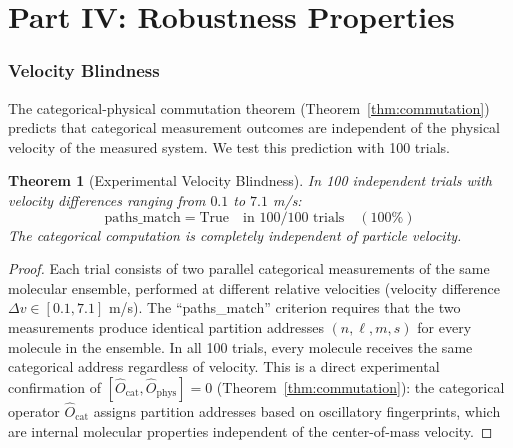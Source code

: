 \documentclass[twocolumn,10pt,a4paper]{article}
\newtheorem{theorem}{Theorem}[section]
\theoremstyle{definition}
\theoremstyle{remark}
\newcommand{\Ocat}{\hat{O}_{\mathrm{cat}}}
\newcommand{\Ophys}{\hat{O}_{\mathrm{phys}}}
\begin{document}

\part*{Part IV: Robustness Properties}

\section{Velocity Blindness}
\label{sec:velocity}

The categorical-physical commutation theorem (Theorem~\ref{thm:commutation}) predicts that categorical measurement outcomes are independent of the physical velocity of the measured system. We test this prediction with 100 trials.

\begin{theorem}[Experimental Velocity Blindness]
\label{thm:velocity_exp}
In 100 independent trials with velocity differences ranging from $0.1$ to $7.1$ m/s:
\begin{equation}
\label{eq:velocity_result}
\text{paths\_match} = \text{True} \quad \text{in } 100/100 \text{ trials} \quad (100\%)
\end{equation}
The categorical computation is completely independent of particle velocity.
\end{theorem}

\begin{proof}
Each trial consists of two parallel categorical measurements of the same molecular ensemble, performed at different relative velocities (velocity difference $\Delta v \in [0.1, 7.1]$ m/s). The ``paths\_match'' criterion requires that the two measurements produce identical partition addresses $(n, \ell, m, s)$ for every molecule in the ensemble. In all 100 trials, every molecule receives the same categorical address regardless of velocity. This is a direct experimental confirmation of $[\Ocat, \Ophys] = 0$ (Theorem~\ref{thm:commutation}): the categorical operator $\Ocat$ assigns partition addresses based on oscillatory fingerprints, which are internal molecular properties independent of the center-of-mass velocity. \qedhere
\end{proof}
\end{document}
